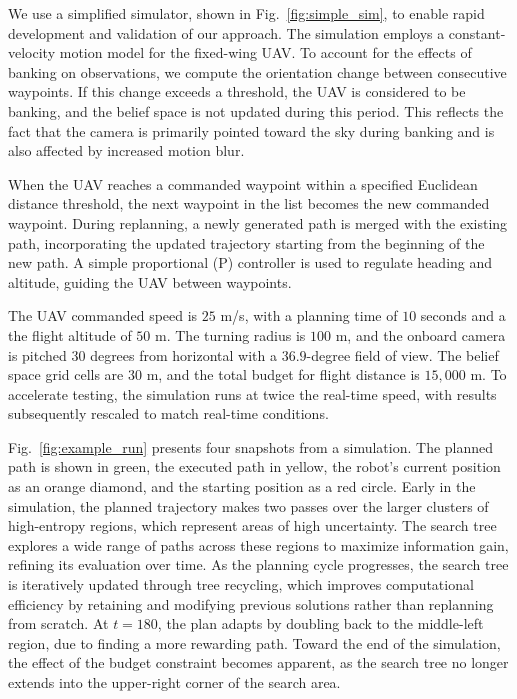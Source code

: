 We use a simplified simulator, shown in Fig.~\ref{fig:simple_sim}, to enable rapid development and validation of our approach. The simulation employs a constant-velocity motion model for the fixed-wing UAV. To account for the effects of banking on observations, we compute the orientation change between consecutive waypoints. If this change exceeds a threshold, the UAV is considered to be banking, and the belief space is not updated during this period. This reflects the fact that the camera is primarily pointed toward the sky during banking and is also affected by increased motion blur.

When the UAV reaches a commanded waypoint within a specified Euclidean distance threshold, the next waypoint in the list becomes the new commanded waypoint. During replanning, a newly generated path is merged with the existing path, incorporating the updated trajectory starting from the beginning of the new path. A simple proportional (P) controller is used to regulate heading and altitude, guiding the UAV between waypoints.

The UAV commanded speed is $25$ m/s, with a planning time of $10$ seconds and a the flight altitude of $50$ m. The turning radius is $100$ m, and the onboard camera is pitched $30$ degrees from horizontal with a $36.9$-degree field of view. The belief space grid cells are $30$ m, and the total budget for flight distance is $15,000$ m. To accelerate testing, the simulation runs at twice the real-time speed, with results subsequently rescaled to match real-time conditions.

Fig.~\ref{fig:example_run} presents four snapshots from a simulation. The planned path is shown in green, the executed path in yellow, the robot's current position as an orange diamond, and the starting position as a red circle. Early in the simulation, the planned trajectory makes two passes over the larger clusters of high-entropy regions, which represent areas of high uncertainty. The search tree explores a wide range of paths across these regions to maximize information gain, refining its evaluation over time. As the planning cycle progresses, the search tree is iteratively updated through tree recycling, which improves computational efficiency by retaining and modifying previous solutions rather than replanning from scratch. At $t=180$, the plan adapts by doubling back to the middle-left region, due to finding a more rewarding path. Toward the end of the simulation, the effect of the budget constraint becomes apparent, as the search tree no longer extends into the upper-right corner of the search area.


